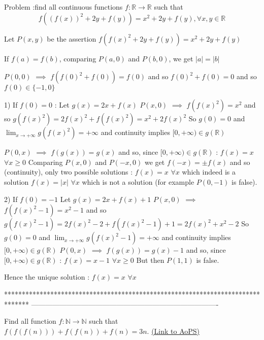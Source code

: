 \begin{solution}
	\begin{tcolorbox}Problem :find all  continuous  functions $f:\mathbb{R}\to\mathbb{R}$ such that \[ f((f(x))^2+2y +f(y))=x^2+2y+f(y),\forall x,y\in \mathbb{R}\]\end{tcolorbox}
Let $P(x,y)$ be the assertion $f(f(x)^2+2y+f(y))=x^2+2y+f(y)$

If $f(a)=f(b)$, comparing $P(a,0)$ and $P(b,0)$, we get $|a|=|b|$

$P(0,0)$ $\implies$ $f(f(0)^2+f(0))=f(0)$ and so $f(0)^2+f(0)=0$ and so $f(0)\in\{-1,0\}$

1) If $f(0)=0$ :
Let $g(x)=2x+f(x)$
$P(x,0)$ $\implies$ $f(f(x)^2)=x^2$ and so $g(f(x)^2)=2f(x)^2+f(f(x)^2)=x^2+2f(x)^2$
So $g(0)=0$ and $\lim_{x\to+\infty}g(f(x)^2)=+\infty$ and continuity implies $[0,+\infty)\in g(\mathbb R)$

$P(0,x)$ $\implies$ $f(g(x))=g(x)$ and so, since $[0,+\infty)\in g(\mathbb R)$ : $f(x)=x$ $\forall x\ge 0$
Comparing $P(x,0)$ and $P(-x,0)$ we get $f(-x)=\pm f(x)$ and so (continuity), only two possible solutions :
$f(x)=x$ $\forall x$ which indeed is a solution
$f(x)=|x|$ $\forall x$ which is not a solution (for example $P(0,-1)$ is false).

2) If $f(0)=-1$
Let $g(x)=2x+f(x)+1$
$P(x,0)$ $\implies$ $f(f(x)^2-1)=x^2-1$ and so $g(f(x)^2-1)=2f(x)^2-2+f(f(x)^2-1)+1=2f(x)^2+x^2-2$
So $g(0)=0$ and $\lim_{x\to+\infty}g(f(x)^2-1)=+\infty$ and continuity implies $[0,+\infty)\in g(\mathbb R)$
$P(0,x)$ $\implies$ $f(g(x))=g(x)-1$ and so, since $[0,+\infty)\in g(\mathbb R)$ : $f(x)=x-1$ $\forall x\ge 0$
But then $P(1,1)$ is false.


Hence the unique solution : $\boxed{f(x)=x}$ $\forall x$
\end{solution}
*******************************************************************************
-------------------------------------------------------------------------------

\begin{problem}
	Find all function $f: \mathbb{N} \rightarrow \mathbb{N}$ such that $f( f( f(n)))+f(f(n))+f(n)=3n$.
	\flushright \href{https://artofproblemsolving.com/community/c6h527513}{(Link to AoPS)}
\end{problem}



